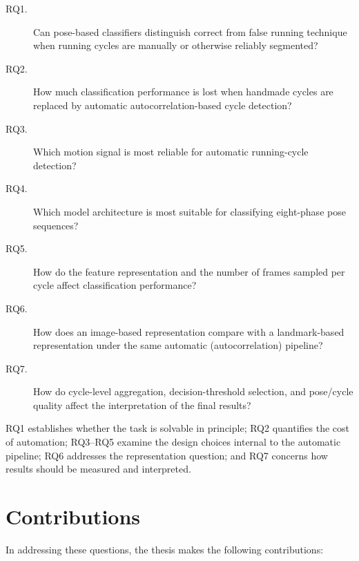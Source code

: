 \begin{description}
  \item[RQ1.] Can pose-based classifiers distinguish correct from false running
        technique when running cycles are manually or otherwise reliably
        segmented?
  \item[RQ2.] How much classification performance is lost when handmade cycles
        are replaced by automatic autocorrelation-based cycle detection?
  \item[RQ3.] Which motion signal is most reliable for automatic running-cycle
        detection?
  \item[RQ4.] Which model architecture is most suitable for classifying
        eight-phase pose sequences?
  \item[RQ5.] How do the feature representation and the number of frames sampled
        per cycle affect classification performance?
  \item[RQ6.] How does an image-based representation compare with a
        landmark-based representation under the same automatic
        (autocorrelation) pipeline?
  \item[RQ7.] How do cycle-level aggregation, decision-threshold selection, and
        pose/cycle quality affect the interpretation of the final results?
\end{description}

RQ1 establishes whether the task is solvable in principle; RQ2 quantifies the
cost of automation; RQ3--RQ5 examine the design choices internal to the
automatic pipeline; RQ6 addresses the representation question; and RQ7 concerns
how results should be measured and interpreted.

\section{Contributions}
\label{sec:intro-contributions}

In addressing these questions, the thesis makes the following contributions:

